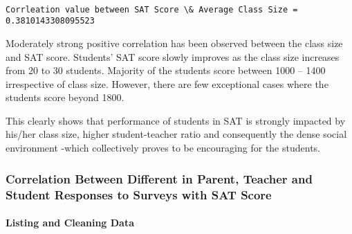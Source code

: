\documentclass[11pt]{article}
\begin{document}
    \begin{center}
    \end{center}
    { \hspace*{\fill} \\}
    
    \begin{Verbatim}[commandchars=\\\{\}]
Corrleation value between SAT Score \& Average Class Size = 0.3810143308095523

    \end{Verbatim}

    Moderately strong positive correlation has been observed between the
class size and SAT score. Students' SAT score slowly improves as the
class size increases from 20 to 30 students. Majority of the students
score between 1000 -- 1400 irrespective of class size. However, there
are few exceptional cases where the students score beyond 1800.

This clearly shows that performance of students in SAT is strongly
impacted by his/her class size, higher student-teacher ratio and
consequently the dense social environment -which collectively proves to
be encouraging for the students.

    \subsubsection{Correlation Between Different in Parent, Teacher and
Student Responses to Surveys with SAT
Score}\label{correlation-between-different-in-parent-teacher-and-student-responses-to-surveys-with-sat-score}

    \paragraph{Listing and Cleaning Data}\label{listing-and-cleaning-data}
\end{document}
